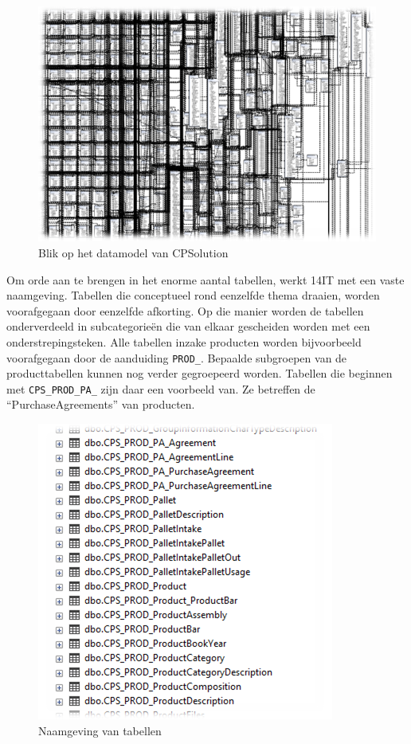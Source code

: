 \begin{figure}[H]
	\centering
	\includegraphics[]{img/erp/cpsolution-dbml.png}
	\caption{\label{fig:cpsolution-dbml}Blik op het datamodel van CPSolution}
\end{figure}


Om orde aan te brengen in het enorme aantal tabellen, werkt 14IT met een vaste naamgeving.
Tabellen die conceptueel rond eenzelfde thema draaien, worden voorafgegaan door eenzelfde afkorting. Op die manier worden de tabellen onderverdeeld in subcategorieën die van elkaar gescheiden worden met een onderstrepingsteken. Alle tabellen inzake producten worden bijvoorbeeld voorafgegaan door de aanduiding \verb*|PROD_|. Bepaalde subgroepen van de producttabellen kunnen nog verder gegroepeerd worden. Tabellen die beginnen met \verb*|CPS_PROD_PA_| zijn daar een voorbeeld van. Ze betreffen de ``PurchaseAgreements'' van producten. 

\begin{figure}[H]
	\centering
	\includegraphics[width=0.5\linewidth]{img/erp/naamgeving-tabellen.png}
	\caption{\label{fig:naamgeving-tabellen}Naamgeving van tabellen}
\end{figure}

